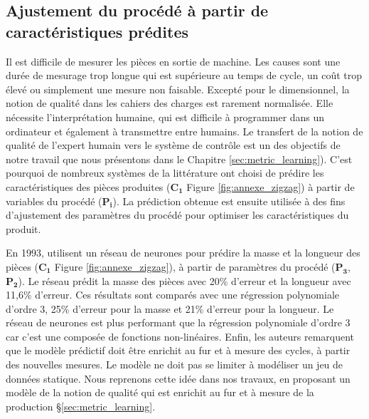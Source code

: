 \subsection{Ajustement du procédé à partir de caractéristiques prédites} \label{parag:adjust_predict}
Il est difficile de mesurer les pièces en sortie de machine.
Les causes sont une durée de mesurage trop longue qui est supérieure au temps de cycle, un coût trop élevé ou simplement une mesure non faisable.
Excepté pour le dimensionnel, la notion de qualité dans les cahiers des charges est rarement normalisée.
Elle nécessite l'interprétation humaine, qui est difficile à programmer dans un ordinateur et également à transmettre entre humains.
Le transfert de la notion de qualité de l'expert humain vers le système de contrôle est un des objectifs de notre travail que nous présentons dans le Chapitre \ref{sec:metric_learning}).
C'est pourquoi de nombreux systèmes de la littérature ont choisi de prédire les caractéristiques des pièces produites ($\boldsymbol{C_1}$ Figure \ref{fig:annexe_zigzag}) à partir de variables du procédé ($\boldsymbol{P_i}$).
La prédiction obtenue est ensuite utilisée à des fins d’ajustement des paramètres du procédé pour optimiser les caractéristiques du produit.

En 1993, \citeauthor{haeussler_quality_1993} \cite{haeussler_quality_1993} utilisent un réseau de neurones pour prédire la masse et la longueur des pièces ($\boldsymbol{C_1}$ Figure \ref{fig:annexe_zigzag}), à partir de paramètres du procédé ($\boldsymbol{P_3}$, $\boldsymbol{P_2}$).
Le réseau prédit la masse des pièces avec 20\% d'erreur et la longueur avec 11,6\% d'erreur.
Ces résultats sont comparés avec une régression polynomiale d'ordre 3, 25\% d'erreur pour la masse et 21\% d'erreur pour la longueur.
Le réseau de neurones est plus performant que la régression polynomiale d'ordre 3 car c'est une composée de fonctions non-linéaires.
Enfin, les auteurs remarquent que le modèle prédictif doit être enrichit au fur et à mesure des cycles, à partir des nouvelles mesures.
Le modèle ne doit pas se limiter à modéliser un jeu de données statique.
Nous reprenons cette idée dans nos travaux, en proposant un modèle de la notion de qualité qui est enrichit au fur et à mesure de la production §\ref{sec:metric_learning}.


